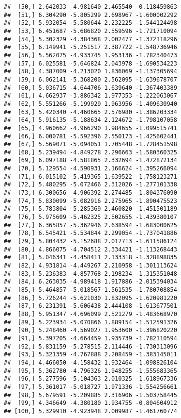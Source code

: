 \documentclass[
]{article}
\begin{document}
\begin{verbatim}
##  [50,] 2.642033 -4.981640 2.465540 -0.118459863
##  [51,] 6.304290 -5.805299 2.698967 -1.600002292
##  [52,] 5.932054 -5.580644 2.232225 -1.544124498
##  [53,] 6.451687 -5.686820 2.559596 -1.721710094
##  [54,] 5.302329 -4.384368 2.002477 -1.372118296
##  [55,] 6.149941 -5.251517 2.387722 -1.548736946
##  [56,] 5.562075 -4.933745 1.953136 -1.782340473
##  [57,] 6.025581 -5.646824 2.043978 -1.690534223
##  [58,] 4.387009 -4.213020 1.836069 -1.137305694
##  [59,] 6.062141 -5.368200 2.562095 -1.639678707
##  [60,] 5.036715 -4.644706 1.639640 -1.367403389
##  [61,] 4.662937 -3.886342 1.977353 -1.222063067
##  [62,] 5.551266 -5.199929 1.963956 -1.409630940
##  [63,] 5.420340 -4.460665 2.576980 -1.386203334
##  [64,] 5.916135 -5.188634 2.124672 -1.798107058
##  [65,] 4.960662 -4.966290 1.984655 -1.099515741
##  [66,] 6.000781 -5.592396 2.550173 -1.425602441
##  [67,] 5.569071 -5.094051 1.705448 -1.728451598
##  [68,] 5.239494 -4.849278 2.296663 -1.580360325
##  [69,] 6.097188 -4.581865 2.332694 -1.472872134
##  [70,] 5.129554 -4.590931 2.166624 -1.395266094
##  [71,] 6.015102 -5.419365 1.639522 -1.758123271
##  [72,] 5.480295 -5.072466 2.312026 -1.277101338
##  [73,] 6.300656 -4.906392 2.274485 -1.804376090
##  [74,] 5.830099 -5.082916 2.275965 -1.890475523
##  [75,] 5.783804 -5.285369 2.460820 -1.451501189
##  [76,] 5.975609 -5.462325 2.502655 -1.439380107
##  [77,] 6.365857 -5.362946 2.638594 -1.683000625
##  [78,] 6.545421 -5.534844 2.299054 -1.737041886
##  [79,] 5.804432 -5.152688 2.017713 -1.611586124
##  [80,] 4.866075 -4.704512 2.334421 -1.113268443
##  [81,] 5.046341 -4.458411 2.133318 -1.328898835
##  [82,] 4.931814 -4.449267 2.210958 -1.301113624
##  [83,] 5.236383 -4.857768 2.198234 -1.315351048
##  [84,] 6.263035 -4.989418 1.917886 -2.015394034
##  [85,] 5.464857 -5.018567 1.561535 -1.780708854
##  [86,] 5.726244 -5.621030 1.832095 -1.620981220
##  [87,] 6.231391 -5.606438 2.444108 -1.613677501
##  [88,] 5.951347 -4.696099 2.521279 -1.483668970
##  [89,] 5.223934 -5.070866 1.889154 -1.512591326
##  [90,] 5.248460 -4.569027 1.953600 -1.396820220
##  [91,] 5.397205 -4.664459 1.935739 -1.782110594
##  [92,] 5.831159 -5.278515 2.114446 -1.730313096
##  [93,] 5.321359 -4.767888 2.208459 -1.383145011
##  [94,] 4.466050 -4.158432 1.932464 -1.098826104
##  [95,] 5.362780 -4.796326 1.948255 -1.555683365
##  [96,] 5.277596 -5.104363 2.010325 -1.618967336
##  [97,] 5.361017 -5.018727 1.971336 -1.554256661
##  [98,] 5.679591 -5.209885 2.316906 -1.503758445
##  [99,] 4.346649 -4.380180 1.934755 -0.804604912
## [100,] 5.329910 -4.923948 2.009987 -1.461760774

\end{verbatim}
\end{document}
